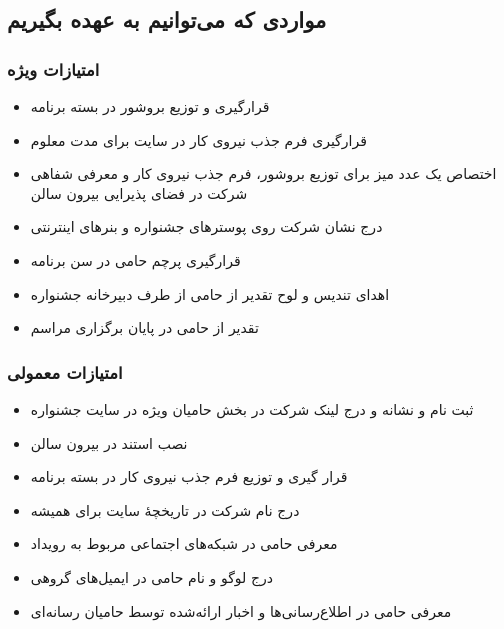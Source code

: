 \documentclass{article}
\begin{document}
\subsection{مواردی که می‌توانیم به عهده بگیریم}

\subsubsection{امتیازات ویژه}

\begin{flushright}
\begin{itemize}
\item قرارگیری و توزیع بروشور در بسته برنامه
\item قرارگیری فرم جذب نیروی کار در سایت برای مدت معلوم
\item اختصاص یک عدد میز برای توزیع بروشور، فرم جذب نیروی کار و معرفی شفاهی شرکت در فضای پذیرایی بیرون سالن
\item درج نشان شرکت روی پوسترهای جشنواره و بنرهای اینترنتی
\item قرارگیری پرچم حامی در سن برنامه
\item اهدای تندیس و لوح تقدیر از حامی از طرف دبیرخانه جشنواره
\item تقدیر از حامی در پایان برگزاری مراسم
\end{itemize}
\end{flushright}

\subsubsection{امتیازات معمولی}
\begin{flushright}


\begin{itemize}
\item ثبت نام و نشانه و درج لینک شرکت در بخش حامیان ویژه در سایت جشنواره
\item نصب استند در بیرون سالن
\item قرار گیری و توزیع فرم جذب نیروی کار در بسته برنامه
\item درج نام شرکت در تاریخچهٔ سایت برای همیشه
\item معرفی حامی در شبکه‌های اجتماعی مربوط به رویداد
\item درج لوگو و نام حامی در ایمیل‌های گروهی
\item معرفی حامی در اطلاع‌رسانی‌ها و اخبار ارائه‌شده توسط حامیان رسانه‌ای
\end{itemize}
\end{flushright}
\end{document}
